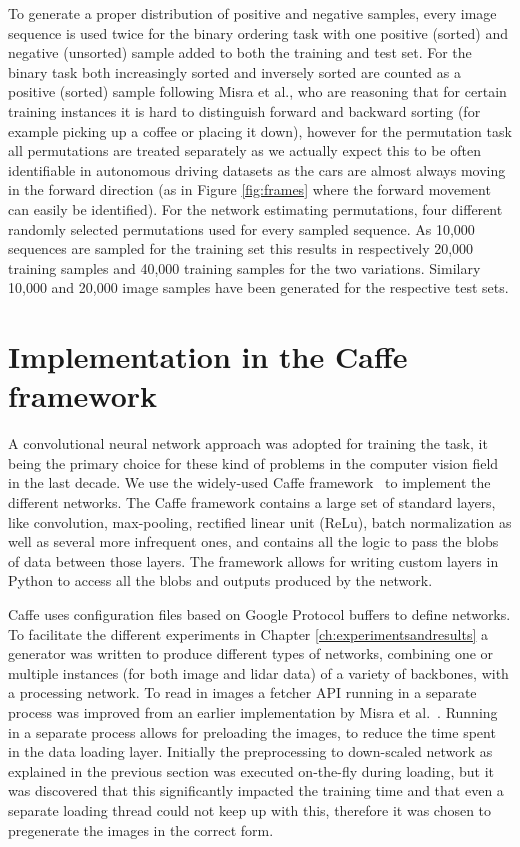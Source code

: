 To generate a proper distribution of positive and negative samples, every image sequence is used twice for the binary ordering task with one positive (sorted) and negative (unsorted) sample added to both the training and test set. For the binary task both increasingly sorted and inversely sorted are counted as a positive (sorted) sample following Misra et al.\cite{misra2016}, who are reasoning that for certain training instances it is hard to distinguish forward and backward sorting (for example picking up a coffee or placing it down), however for the permutation task all permutations are treated separately as we actually expect this to be often identifiable in autonomous driving datasets as the cars are almost always moving in the forward direction (as in Figure \ref{fig:frames} where the forward movement can easily be identified). For the network estimating permutations, four different randomly selected permutations used for every sampled sequence. As 10,000 sequences are sampled for the training set this results in respectively 20,000 training samples and 40,000 training samples for the two variations. Similary 10,000 and 20,000 image samples have been generated for the respective test sets. 

\section{Implementation in the Caffe framework}
A convolutional neural network approach was adopted for training the task, it being the primary choice for these kind of problems in the computer vision field in the last decade. We use the widely-used Caffe framework~\cite{jia2014} to implement the different networks. The Caffe framework contains a large set of standard layers, like convolution, max-pooling, rectified linear unit (ReLu), batch normalization as well as several more infrequent ones, and contains all the logic to pass the blobs of data between those layers. The framework allows for writing custom layers in Python to access all the blobs and outputs produced by the network.

Caffe uses configuration files based on Google Protocol buffers to define networks. To facilitate the different experiments in Chapter \ref{ch:experimentsandresults} a generator was written to produce different types of networks, combining one or multiple instances (for both image and lidar data) of a variety of backbones, with a processing network. To read in images a fetcher API running in a separate process was improved from an earlier implementation by Misra et al.~\cite{misra2016}. Running in a separate process allows for preloading the images, to reduce the time spent in the data loading layer. Initially the preprocessing to down-scaled network as explained in the previous section was executed on-the-fly during loading, but it was discovered that this significantly impacted the training time and that even a separate loading thread could not keep up with this, therefore it was chosen to pregenerate the images in the correct form.

